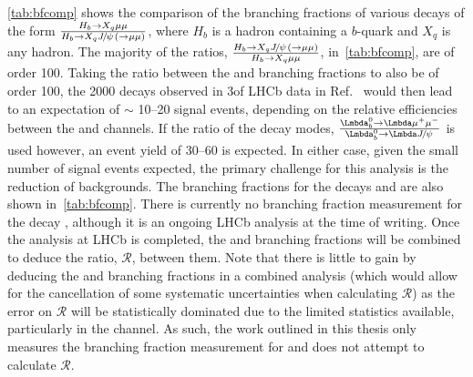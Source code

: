 \autoref{tab:bfcomp} shows the comparison of the branching fractions of various decays of the form $\frac{H_{b}\rightarrow X_{q}\mu\mu}{H_{b} \rightarrow X_{q} {{J\mkern -3mu/\mkern -2mu\psi\mkern 2mu}} (\rightarrow\mu\mu)}$, where $H_b$ is a hadron containing a $b$-quark and $X_{q}$ is any hadron. The majority of the ratios, $\frac{H_{b} \rightarrow X_{q} {{J\mkern -3mu/\mkern -2mu\psi\mkern 2mu}} (\rightarrow\mu\mu)}{H_{b}\rightarrow X_{q}\mu\mu}$, in~\autoref{tab:bfcomp}, are of order 100. Taking the ratio between the \Lbpijpsi and \Lbpi branching fractions  to also be of order 100, the 2000 \Lbpijpsi decays observed in 3\invfb of LHCb data in Ref.~\cite{LHCb-PAPER-2014-020} would then lead to an expectation of $\sim$ 10--20 \Lbpi signal events, depending on the relative efficiencies between the \Lbpi and \Lbpijpsi channels. If the ratio of the \Lb decay modes, $\frac{\Lb\to\PLambda\mup\mun}{\Lb\to\PLambda\jpsi}$  is used however, an event yield of 30--60 is expected. In either case, given the small number of signal events expected, the primary challenge for this analysis is the reduction of backgrounds. The branching fractions for the decays \Lbpijpsi and \LbKjpsi are also shown in~\autoref{tab:bfcomp}. There is currently no branching fraction measurement for the decay \LbK, although it is an ongoing LHCb analysis at the time of writing. Once the \LbK analysis at LHCb is completed, the \LbK and \Lbpi branching fractions will be combined to deduce the ratio, $\mathcal{R}$, between them. Note that there is little to gain by deducing the \LbK and \Lbpi branching fractions in a combined analysis (which would allow for the cancellation of some systematic uncertainties when calculating $\mathcal{R}$) as the error on $\mathcal{R}$ will be statistically dominated due to the limited statistics available, particularly in the \Lbpi channel. As such, the work outlined in this thesis only measures the branching fraction measurement for \Lbpi and does not attempt to calculate $\mathcal{R}$.  %


